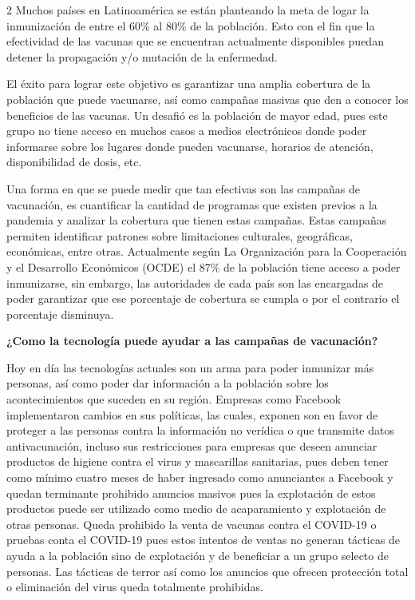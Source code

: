\documentclass[12pt,spanish,Letterpaper,openany]{book}
\begin{document}
\begin {multicols}{2}
Muchos países en Latinoamérica se están planteando la meta de logar la inmunización de
entre el 60\% al 80\% de la población. Esto con el fin que la efectividad de las vacunas que se
encuentran actualmente disponibles puedan detener la propagación y/o mutación de la
enfermedad.

El éxito para lograr este objetivo es garantizar una amplia cobertura de la población que
puede vacunarse, así como campañas masivas que den a conocer los beneficios de las
vacunas. Un desafió es la población de mayor edad, pues este grupo no tiene acceso en
muchos casos a medios electrónicos donde poder informarse sobre los lugares donde pueden
vacunarse, horarios de atención, disponibilidad de dosis, etc.

Una forma en que se puede medir que tan efectivas son las campañas de vacunación, es
cuantificar la cantidad de programas que existen previos a la pandemia y analizar la cobertura
que tienen estas campañas. Estas campañas permiten identificar patrones sobre limitaciones
culturales, geográficas, económicas, entre otras. Actualmente según La Organización para la
Cooperación y el Desarrollo Económicos (OCDE) el 87\% de la población tiene acceso a
poder inmunizarse, sin embargo, las autoridades de cada país son las encargadas de poder
garantizar que ese porcentaje de cobertura se cumpla o por el contrario el porcentaje
disminuya.

\textbf{¿Como la tecnología puede ayudar a las campañas de vacunación?}

Hoy en día las tecnologías actuales son un arma para poder inmunizar más personas, así como
poder dar información a la población sobre los acontecimientos que suceden en su región.
Empresas como Facebook implementaron cambios en sus políticas, las cuales, exponen son
en favor de proteger a las personas contra la información no verídica o que transmite datos
antivacunación, incluso sus restricciones para empresas que deseen anunciar productos de
higiene contra el virus y mascarillas sanitarias, pues deben tener como mínimo cuatro meses
de haber ingresado como anunciantes a Facebook y quedan terminante prohibido anuncios
masivos pues la explotación de estos productos puede ser utilizado como medio de
acaparamiento y explotación de otras personas. Queda prohibido la venta de vacunas contra
el COVID-19 o pruebas conta el COVID-19 pues estos intentos de ventas no generan tácticas
de ayuda a la población sino de explotación y de beneficiar a un grupo selecto de personas.
Las tácticas de terror así como los anuncios que ofrecen protección total o eliminación del
virus queda totalmente prohibidas.


\end{multicols}
\end{document}
